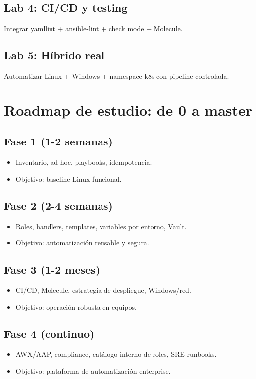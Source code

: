 \documentclass[12pt,a4paper]{article}
\begin{document}
\subsection*{Lab 4: CI/CD y testing}
Integrar yamllint + ansible-lint + check mode + Molecule.

\subsection*{Lab 5: Híbrido real}
Automatizar Linux + Windows + namespace k8s con pipeline controlada.

\section{Roadmap de estudio: de 0 a master}

\subsection*{Fase 1 (1-2 semanas)}
\begin{itemize}
  \item Inventario, ad-hoc, playbooks, idempotencia.
  \item Objetivo: baseline Linux funcional.
\end{itemize}

\subsection*{Fase 2 (2-4 semanas)}
\begin{itemize}
  \item Roles, handlers, templates, variables por entorno, Vault.
  \item Objetivo: automatización reusable y segura.
\end{itemize}

\subsection*{Fase 3 (1-2 meses)}
\begin{itemize}
  \item CI/CD, Molecule, estrategia de despliegue, Windows/red.
  \item Objetivo: operación robusta en equipos.
\end{itemize}

\subsection*{Fase 4 (continuo)}
\begin{itemize}
  \item AWX/AAP, compliance, catálogo interno de roles, SRE runbooks.
  \item Objetivo: plataforma de automatización enterprise.
\end{itemize}
\end{document}
